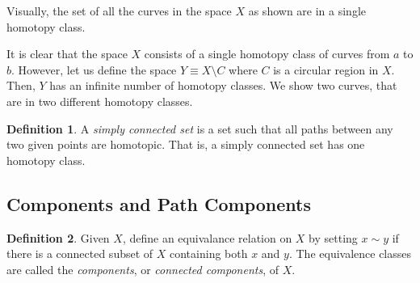 \documentclass{article}
\theoremstyle{remark}
\theoremstyle{definition}
\newtheorem{definition}{Definition}[section]
\begin{document}
Visually, the set of all the curves in the space $X$ as shown are in a single homotopy class.
\begin{center}
\end{center}
It is clear that the space $X$ consists of a single homotopy class of curves from $a$ to $b$. However, let us define the space $Y \equiv X \setminus C$ where $C$ is a circular region in $X$. Then, $Y$ has an infinite number of homotopy classes. We show two curves, that are in two different homotopy classes. 
\begin{center}
\end{center}

\begin{definition}
A \textit{simply connected set} is a set such that all paths between any two given points are homotopic. That is, a simply connected set has one homotopy class. 
\end{definition}

\subsection{Components and Path Components}

\begin{definition}
Given $X$, define an equivalance relation on $X$ by setting $x \sim y$ if there is a connected subset of $X$ containing both $x$ and $y$. The equivalence classes are called the \textit{components}, or \textit{connected components}, of $X$. 
\end{definition}
\end{document}
